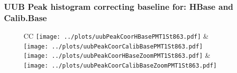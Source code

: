 \documentclass[aspectratio=169]{beamer}
\begin{document}

\begin{frame}
	\frametitle{UUB Peak histogram correcting baseline for: HBase and Calib.Base}
	\begin{figure}
		\centering
		\begin{tabularx}{\textwidth}{CC}
			\texttt{[image: ../plots/uubPeakCoorHBasePMT1St863.pdf]}
			&
			\texttt{[image: ../plots/uubPeakCoorCalibBasePMT1St863.pdf]}
			\\
			\texttt{[image: ../plots/uubPeakCoorHBaseZoomPMT1St863.pdf]}
			&
			\texttt{[image: ../plots/uubPeakCoorCalibBaseZoomPMT1St863.pdf]}
			\\
		\end{tabularx}
	\end{figure}
\end{frame}
%
%




\end{document}
